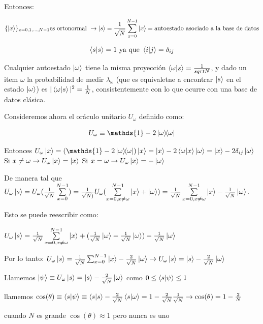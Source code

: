 Entonces:

$$\{\ket{x}\}_{x=0,1,...,N-1} \text{es ortonormal }\rightarrow \ket{s} =
\frac{1}{\sqrt{N}} \sum\limits_{x=0}^{N-1} \ket{x} = \text{autoestado asociado a
  la base de datos}$$

$$\braket{s}{s} = 1 \text{ ya que } \braket{i}{j} = \delta_{ij}$$

Cualquier autoestado $\ket{\omega}$ tiene la misma proyección
$\braket{\omega}{s} = \frac{1}{sqrt{N}}$, y dado un item $\omega$ la
probabilidad de medir $\lambda_\omega$ (que es equivaletne a encontrar $\ket{s}$
en el estado $\ket{\omega}$) es $|\braket{\omega}{s}|^2 = \frac{1}{N}$,
consistentemente con lo que ocurre con una base de datos clásica.

Consideremos ahora el oráculo unitario $U_\omega$ definido como:

$$U_\omega \equiv \mathds{1} - 2\ketbra{\omega}{\omega}$$

Entonces $U_\omega \ket{x} = (\mathds{1} - 2\ketbra{\omega}{\omega}) \ket{x} =
\ket{x} - 2 \braket{\omega}{x} \ket{\omega} = \ket{x} - 2 \delta_{ij} \ket{\omega}$
 Si $x \neq \omega \rightarrow U_\omega \ket{x} = \ket{x}$ 
 Si $x = \omega \rightarrow U_\omega \ket{x} = -\ket{\omega}$ 

De manera tal que $U_\omega \ket{s} = U_\omega (\frac{1}{\sqrt{N}}
\sum\limits_{x = 0}^{N-1}) = \frac{1}{\sqrt{N})} U_\omega (\sum\limits_{x=0,
  x\neq\omega}^{N-1} \ket{x} + \ket{\omega}) =
\frac{1}{\sqrt{N}}\sum\limits_{x=0, x\neq\omega}^{N-1} \ket{x} -
\frac{1}{\sqrt{N}} \ket{\omega}$.

Esto se puede reescribir como:

$U_\omega \ket{s} = \frac{1}{\sqrt{N}} \sum\limits_{x=0, x\neq\omega}^{N-1}
\ket{x} + (\frac{1}{\sqrt{N}} \ket{\omega} - \frac{1}{\sqrt{N}} \ket{\omega} )- \frac{1}{\sqrt{N}} \ket{\omega} $

Por lo tanto: $U_\omega \ket{s} = \frac{1}{\sqrt{N}} \sum_{x=0}^{N-1} \ket{x} -
\frac{2}{\sqrt{N}} \ket{\omega} \rightarrow U_\omega \ket{s} = \ket{s} -
\frac{2}{\sqrt{N}} \ket{\omega}$

Llamemos $\ket{\psi} \equiv U_\omega \ket{s} = \ket{s} - \frac{2}{\sqrt{N}} \ket{\omega}$
como $0 \leq \braket{s}{\psi} \leq 1$

llamemos $\cos(\theta) \equiv \braket{s}{\psi} \equiv \braket{s}{s} -
\frac{2}{\sqrt{N}} \braket{s}{\omega} = 1 - \frac{2}{\sqrt{N}}
\frac{1}{\sqrt{N}} \rightarrow \cos(\theta) = 1 - \frac{2}{N}$

cuando $N$ es grande $\cos(\theta) \approx 1$ pero nunca es uno

